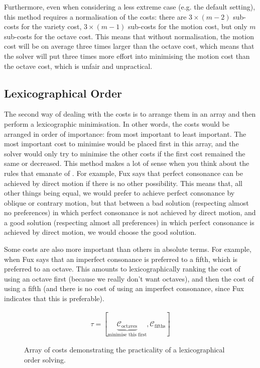 Furthermore, even when considering a less extreme case (e.g. the default setting), this method requires a normalisation of the costs: there are $3\times (m-2)$ sub-costs for the variety cost, $3\times (m-1)$ sub-costs for the motion cost, but only $m$ sub-costs for the octave cost. This means that without normalisation, the motion cost will be on average three times larger than the octave cost, which means that the solver will put three times more effort into minimising the motion cost than the octave cost, which is unfair and unpractical.


\subsection{Lexicographical Order}\label{section:lexicographical-order}
The second way of dealing with the costs is to arrange them in an array and then perform a lexicographic minimisation. In other words, the costs would be arranged in order of importance: from most important to least important. The most important cost to minimise would be placed first in this array, and the solver would only try to minimise the other costs if the first cost remained the same or decreased. This method makes a lot of sense when you think about the rules that emanate of \gap. For example, Fux says that perfect consonance can be achieved by direct motion if there is no other possibility. This means that, all other things being equal, we would prefer to achieve perfect consonance by oblique or contrary motion, but that between a bad solution (respecting almost no preferences) in which perfect consonance is not achieved by direct motion, and a good solution (respecting almost all preferences) in which perfect consonance is achieved by direct motion, we would choose the good solution. 

Some costs are also more important than others in absolute terms. For example, when Fux says that an imperfect consonance is preferred to a fifth, which is preferred to an octave. This amounts to lexicographically ranking the cost of using an octave first (because we really don't want octaves), and then the cost of using a fifth (and there is no cost of using an imperfect consonance, since Fux indicates that this is preferable).
\begin{figure}[h]
    \begin{equation}
        \begin{aligned}
            \tau = [\underset{\text{minimise this first}}{\underbrace{\mathcal{C}_\text{octaves}}}, \mathcal{C}_\text{fifths}]
        \end{aligned}
    \end{equation}
    \caption{Array of costs demonstrating the practicality of a lexicographical order solving.}
\end{figure}

